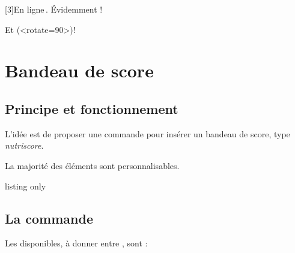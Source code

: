 \documentclass[french,11pt,a4paper]{article}
\begin{document}
\begin{DemoCode}{}
\def\calcheightofchars{É}
\def\calctotheightofchars{()}
\def\calcdepthofchars{()}
\scalebox{3}[3]{En ligne\,\pictobullseye[height=auto,colors,listcolors={green!50,orange!50,red!50}]. Évidemment !}

{\huge Et (\pictobullseye[colors,listcolors={red!50,yellow!50,teal!50}]<rotate=90>)!}
\end{DemoCode}

\pagebreak

\section{Bandeau de score}

\subsection{Principe et fonctionnement}

L'idée est de proposer une commande pour insérer un bandeau de score, type \textit{nutriscore}.

\smallskip

La majorité des éléments sont personnalisables.

\begin{DemoCode}{listing only}
\end{DemoCode}

\begin{DemoCode}{}
\BandeauScore{}
\end{DemoCode}

\subsection{La commande}

Les  disponibles, à donner entre \MontreCode{[...]}, sont :
\end{document}
